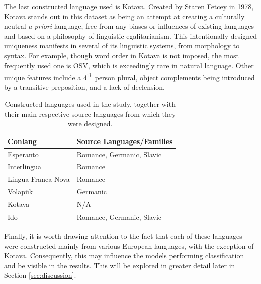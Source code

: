 \documentclass[12pt,a4paper]{article}
\numberwithin{figure}{section}
\numberwithin{table}{section}
\numberwithin{definition}{section}
\begin{document}

The last constructed language used is Kotava. Created by Staren Fetcey in 1978, Kotava stands out in this dataset as being an attempt at creating a culturally neutral \textit{a priori} language, free from any biases or influences of existing languages and based on a philosophy of linguistic egalitarianism. This intentionally designed uniqueness manifests in several of its linguistic systems, from morphology to syntax. For example, though word order in Kotava is not imposed, the most frequently used one is OSV, which is exceedingly rare in natural language. Other unique features include a 4\textsuperscript{th} person plural, object complements being introduced by a transitive preposition, and a lack of declension. 


\begin{table}[h!]
  \centering
  \renewcommand{\arraystretch}{1.5}
  \begin{tabular} {|p{5cm}|p{5cm}|}
  \hline
  \textbf{Conlang} & \textbf{Source Languages/Families} \\
  \hline
  Esperanto & Romance, Germanic, Slavic \\
  \hline
  Interlingua & Romance \\
  \hline
  Lingua Franca Nova & Romance \\
  \hline
  Volapük & Germanic \\
  \hline
  Kotava & N/A \\
  \hline
  Ido & Romance, Germanic, Slavic \\
  \hline
  \end{tabular}
  \caption{Constructed languages used in the study, together with their main respective source languages from which they were designed.}
  \label{tbl:conlangs}
\end{table}

Finally, it is worth drawing attention to the fact that each of these languages were constructed mainly from various European languages, with the exception of Kotava. Consequently, this may influence the models performing classification and be visible in the results. This will be explored in greater detail later in Section \ref{sec:discussion}.
\end{document}
